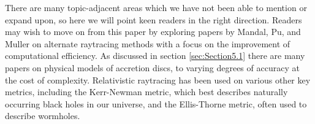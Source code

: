 \documentclass[oneside,openright,frontopenright, singlespacing]{dmathesis}
\begin{document}
\begin{conclusion}
\vspace{1em}
	There are many topic-adjacent areas which we have not been able to mention or expand upon, so here we will point keen readers in the right direction. Readers may wish to move on from this paper by exploring papers by Mandal\cite{mandal2021non}, Pu\cite{pu2016odyssey}, and Muller\cite{muller2021adaptive} on alternate raytracing methods with a focus on the improvement of computational efficiency. As discussed in section \ref{sec:Section5.1} there are many papers on physical models of accretion discs, to varying degrees of accuracy at the cost of complexity\cite{shakura1973black}\cite{novikov1973astrophyics}\cite{perapechka2018effective}. Relativistic raytracing has been used on various other key metrics, including the Kerr-Newman metric, which best describes naturally occurring black holes in our universe, and the Ellis-Thorne metric, often used to describe wormholes\cite{thorne2015visualizing}.

\end{conclusion}


\appendix
\end{document}
